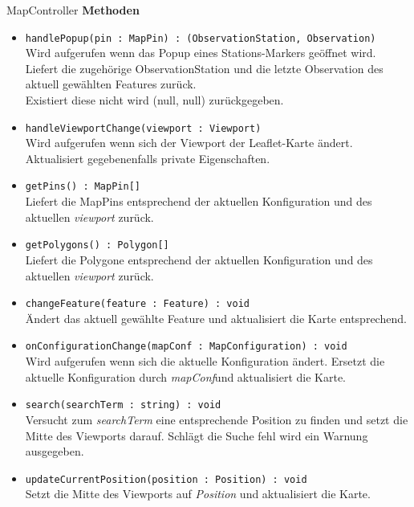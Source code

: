     \begin{Class}{MapController}
        \textbf{Methoden}
        \begin{itemize}
            \item \texttt{handlePopup(pin : MapPin) : (ObservationStation, Observation)}
            \\ Wird aufgerufen wenn das Popup eines Stations-Markers geöffnet wird.
            \\ Liefert die zugehörige ObservationStation und die letzte Observation des aktuell gewählten Features zurück.
            \\ Existiert diese nicht wird (null, null) zurückgegeben.
            \item \texttt{handleViewportChange(viewport : Viewport)}
            \\ Wird aufgerufen wenn sich der Viewport der Leaflet-Karte ändert.
            \\ Aktualisiert gegebenenfalls private Eigenschaften.
            \bigskip
            \item \texttt{getPins() : MapPin[]}
            \\ Liefert die MapPins entsprechend der aktuellen Konfiguration und des aktuellen \emph{viewport} zurück.
            \item \texttt{getPolygons() : Polygon[]}
            \\ Liefert die Polygone entsprechend der aktuellen Konfiguration und des aktuellen \emph{viewport} zurück.
            \bigskip
            \item \texttt{changeFeature(feature : Feature) : void}
            \\ Ändert das aktuell gewählte Feature und aktualisiert die Karte entsprechend.
            \item \texttt{onConfigurationChange(mapConf : MapConfiguration) : void}
            \\ Wird aufgerufen wenn sich die aktuelle Konfiguration ändert. Ersetzt die aktuelle Konfiguration durch \emph{mapConf}und aktualisiert die Karte.
            \item \texttt{search(searchTerm : string) : void}
            \\ Versucht zum \emph{searchTerm} eine entsprechende Position zu finden und setzt die Mitte des Viewports darauf.
            Schlägt die Suche fehl wird ein Warnung ausgegeben.
            \item \texttt{updateCurrentPosition(position : Position) : void}
            \\ Setzt die Mitte des Viewports auf \emph{Position} und aktualisiert die Karte. 
        \end{itemize}
    \end{Class}

